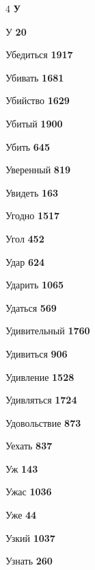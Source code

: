 \begin{multicols}{4}
\vspace{0.6em}\noindent\textbf{\normalsize\sffamily\color{primary} У}\par\vspace{0.2em}
\noindent У \dotfill \textbf{\color{secondary} 20}\par
\noindent Убедиться \dotfill \textbf{\color{secondary} 1917}\par
\noindent Убивать \dotfill \textbf{\color{secondary} 1681}\par
\noindent Убийство \dotfill \textbf{\color{secondary} 1629}\par
\noindent Убитый \dotfill \textbf{\color{secondary} 1900}\par
\noindent Убить \dotfill \textbf{\color{secondary} 645}\par
\noindent Уверенный \dotfill \textbf{\color{secondary} 819}\par
\noindent Увидеть \dotfill \textbf{\color{secondary} 163}\par
\noindent Угодно \dotfill \textbf{\color{secondary} 1517}\par
\noindent Угол \dotfill \textbf{\color{secondary} 452}\par
\noindent Удар \dotfill \textbf{\color{secondary} 624}\par
\noindent Ударить \dotfill \textbf{\color{secondary} 1065}\par
\noindent Удаться \dotfill \textbf{\color{secondary} 569}\par
\noindent Удивительный \dotfill \textbf{\color{secondary} 1760}\par
\noindent Удивиться \dotfill \textbf{\color{secondary} 906}\par
\noindent Удивление \dotfill \textbf{\color{secondary} 1528}\par
\noindent Удивляться \dotfill \textbf{\color{secondary} 1724}\par
\noindent Удовольствие \dotfill \textbf{\color{secondary} 873}\par
\noindent Уехать \dotfill \textbf{\color{secondary} 837}\par
\noindent Уж \dotfill \textbf{\color{secondary} 143}\par
\noindent Ужас \dotfill \textbf{\color{secondary} 1036}\par
\noindent Уже \dotfill \textbf{\color{secondary} 44}\par
\noindent Узкий \dotfill \textbf{\color{secondary} 1037}\par
\noindent Узнать \dotfill \textbf{\color{secondary} 260}\par

\end{multicols}
